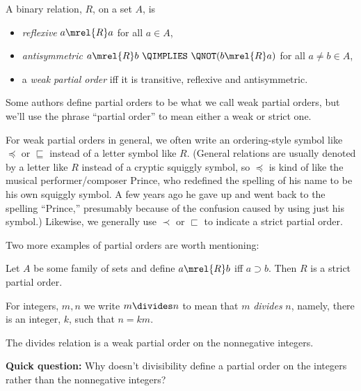 \begin{definition}
A binary relation, $R$, on a set $A$, is
\begin{itemize}

\item \emph{reflexive} \qiff $a \mrel{R}  a$ \quad for all $a \in A$,

\item \emph{antisymmetric}\label{antis} \qiff
$a \mrel{R}  b\ \QIMPLIES\ \QNOT(b \mrel{R}  a)$
\quad for all $a \neq b \in A$,

\item a \emph{weak partial order} iff it is transitive, reflexive and
antisymmetric.

\end{itemize}
\end{definition}
%
Some authors define partial orders to be what we call weak partial orders,
but we'll use the phrase ``partial order'' to mean either a weak or strict
one.

For weak partial orders in general, we often write an ordering-style
symbol like $\preceq$ or $\sqsubseteq$ instead of a letter symbol like
$R$.  (General relations are usually denoted by a letter like $R$ instead
of a cryptic squiggly symbol, so $\preceq$ is kind of like the musical
performer/composer Prince, who redefined the spelling of his name to be
his own squiggly symbol.  A few years ago he gave up and went back to the
spelling ``Prince,'' presumably because of the confusion caused by using
just his symbol.)  Likewise, we generally use $\prec$ or $\sqsubset$ to
indicate a strict partial order.  \iffalse We also write $b \succeq a$ to
mean $a \preceq b$ and $b \succ a$ to mean $a \prec b$.\fi

Two more examples of partial orders are worth mentioning:

\begin{example}\label{supset}
Let $A$ be some family of sets and define $a \mrel{R} b$ iff $a
\supset b$.  Then $R$ is a strict partial order.
\end{example}

For integers, $m,n$ we write $m \divides n$ to mean that $m$
\emph{divides} $n$, namely, there is an integer, $k$, such that $n=km$.

\begin{example}\label{divides}
The divides relation is a weak partial order on the nonnegative integers.
\end{example}

\textbf{Quick question:}  Why doesn't divisibility define a partial order
on the integers rather than the nonnegative integers?
\medskip

